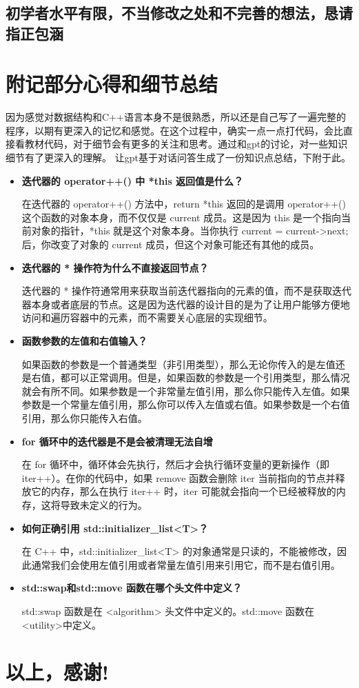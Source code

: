 \documentclass[UTF8]{ctexart}
\begin{document}
\subsection{初学者水平有限，不当修改之处和不完善的想法，恳请指正包涵}

\section{附记部分心得和细节总结}
    因为感觉对数据结构和C++语言本身不是很熟悉，所以还是自己写了一遍完整的程序，以期有更深入的记忆和感觉。在这个过程中，确实一点一点打代码，会比直接看教材代码，对于细节会有更多的关注和思考。通过和gpt的讨论，对一些知识细节有了更深入的理解。
    让gpt基于对话问答生成了一份知识点总结，下附于此。
    \begin{itemize}  
        \item \textbf{迭代器的 operator++() 中 *this 返回值是什么？}  
          
        在迭代器的 operator++() 方法中，return *this 返回的是调用 operator++() 这个函数的对象本身，而不仅仅是 current 成员。这是因为 this 是一个指向当前对象的指针，*this 就是这个对象本身。当你执行 current = current->next; 后，你改变了对象的 current 成员，但这个对象可能还有其他的成员。  
          
        \item \textbf{迭代器的 * 操作符为什么不直接返回节点？}  
          
        迭代器的 * 操作符通常用来获取当前迭代器指向的元素的值，而不是获取迭代器本身或者底层的节点。这是因为迭代器的设计目的是为了让用户能够方便地访问和遍历容器中的元素，而不需要关心底层的实现细节。  
          
        \item \textbf{函数参数的左值和右值输入？}  
          
        如果函数的参数是一个普通类型（非引用类型），那么无论你传入的是左值还是右值，都可以正常调用。但是，如果函数的参数是一个引用类型，那么情况就会有所不同。如果参数是一个非常量左值引用，那么你只能传入左值。如果参数是一个常量左值引用，那么你可以传入左值或右值。如果参数是一个右值引用，那么你只能传入右值。  
          
        \item \textbf{for 循环中的迭代器是不是会被清理无法自增}  
          
        在 for 循环中，循环体会先执行，然后才会执行循环变量的更新操作（即 iter++）。在你的代码中，如果 remove 函数会删除 iter 当前指向的节点并释放它的内存，那么在执行 iter++ 时，iter 可能就会指向一个已经被释放的内存，这将导致未定义的行为。  
          
        \item \textbf{如何正确引用 std::initializer\_list<T>？}  
          
        在 C++ 中，std::initializer\_list<T> 的对象通常是只读的，不能被修改，因此通常我们会使用左值引用或者常量左值引用来引用它，而不是右值引用。  
          
        \item \textbf{std::swap和std::move 函数在哪个头文件中定义？}  
          
        std::swap 函数是在 <algorithm> 头文件中定义的。std::move 函数在<utility>中定义。
        \end{itemize}  


\section*{以上，感谢!}     


        
\end{document}

